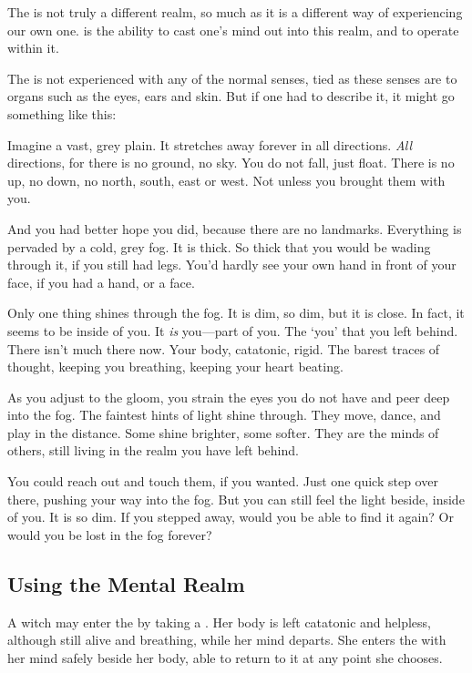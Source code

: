 The {\mentalrealm} is not truly a different realm, so much as it is a different way of experiencing our own one.
 is the ability to cast one's mind out into this realm, and to operate within it.

The {\mentalrealm} is not experienced with any of the normal senses, tied as these senses are to organs such as the eyes, ears and skin.
But if one had to describe it, it might go something like this:

Imagine a vast, grey plain.
It stretches away forever in all directions.
\emph{All} directions, for there is no ground, no sky.
You do not fall, just float.
There is no up, no down, no north, south, east or west.
Not unless you brought them with you.

And you had better hope you did, because there are no landmarks.
Everything is pervaded by a cold, grey fog.
It is thick.
So thick that you would be wading through it, if you still had legs.
You'd hardly see your own hand in front of your face, if you had a hand, or a face.

Only one thing shines through the fog.
It is dim, so dim, but it is close.
In fact, it seems to be inside of you.
It \emph{is} you---part of you.
The `you' that you left behind.
There isn't much there now.
Your body, catatonic, rigid.
The barest traces of thought, keeping you breathing, keeping your heart beating.

As you adjust to the gloom, you strain the eyes you do not have and peer deep into the fog.
The faintest hints of light shine through.
They move, dance, and play in the distance.
Some shine brighter, some softer.
They are the minds of others, still living in the realm you have left behind.

You could reach out and touch them, if you wanted.
Just one quick step over there, pushing your way into the fog.
But you can still feel the light beside, inside of you.
It is so dim.
If you stepped away, would you be able to find it again?
Or would you be lost in the fog forever?

\subsection{Using the Mental Realm}

A witch may enter the {\mentalrealm} by taking a .
Her body is left catatonic and helpless, although still alive and breathing, while her mind departs.
She enters the {\mentalrealm} with her mind safely beside her body, able to return to it at any point she chooses.

